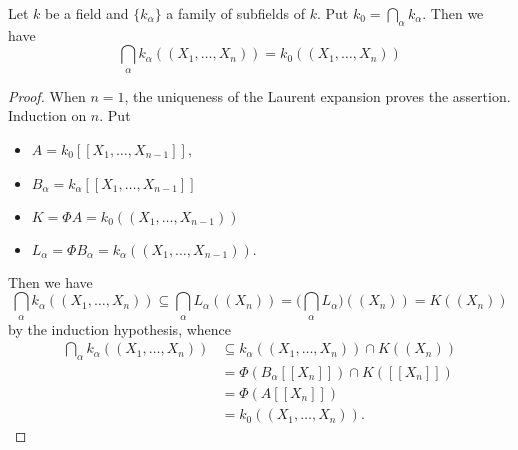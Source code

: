\documentclass[../main]{subfiles}
\begin{document}
\begin{proposition}\label{prop:30.01}
Let $k$ be a field and $\{k_\alpha\}$ a family of subfields of $k$. Put $k_0 = \bigcap_\alpha k_\alpha$. Then we have 
\[
\bigcap_\alpha k_\alpha ((X_1, \ldots, X_n)) = k_0((X_1, \ldots, X_n))
\]
\end{proposition}

\begin{proof}
When $n = 1$, the uniqueness of the Laurent expansion proves the assertion. Induction on $n$. Put
\begin{itemize}
    \item $A = k_0[[X_1, \ldots, X_{n - 1}]]$,
    \item $B_\alpha = k_\alpha[[X_1, \ldots, X_{n - 1}]]$
    \item $K = \Phi A = k_0 ((X_1, \ldots, X_{n - 1}))$
    \item $ L_\alpha = \Phi B_\alpha = k_\alpha ((X_1, \ldots, X_{n - 1})).$
\end{itemize}
Then we have
\[
\bigcap_\alpha k_\alpha ((X_1, \ldots, X_n)) \subseteq \bigcap_\alpha L_\alpha ((X_n)) = \Big(\bigcap_\alpha L_\alpha\Big)((X_n)) = K((X_n))
\]
by the induction hypothesis, whence
\[
\begin{aligned}
\bigcap_\alpha k_\alpha ((X_1, \ldots, X_n)) & \subseteq k_\alpha ((X_1, \ldots, X_n)) \cap K((X_n)) \\ & = \Phi(B_\alpha [[X_n]]) \cap K([[X_n]]) \\ & = \Phi(A[[X_n]]) \\ & = k_0((X_1, \ldots, X_n)).
\end{aligned}\]
\end{proof}
\end{document}
